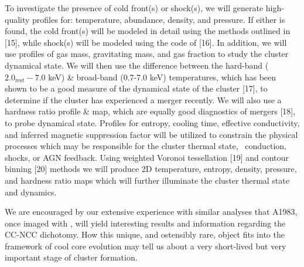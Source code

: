 \documentclass[letterpaper,11pt,twocolumn]{article}
\begin{document}
To investigate the presence of cold front(s) or shock(s), we will
generate high-quality profiles for: temperature, abundance, density,
and pressure. If either is found, the cold front(s) will be modeled in
detail using the methods outlined in [15], while shock(s) will be
modeled using the code of [16]. In addition, we will use profiles of
gas mass, gravitating mass, and gas fraction to study the cluster
dynamical state. We will then use the difference between the hard-band
($2.0_{\mathrm{rest}}-7.0$ keV) \& broad-band (0.7-7.0 keV)
temperatures, which has been shown to be a good measure of the
dynamical state of the cluster [17], to determine if the cluster has
experienced a merger recently. We will also use a hardness ratio
profile \& map, which are equally good diagnostics of mergers [18], to
probe dynamical state. Profiles for entropy, cooling time, effective
conductivity, and inferred magnetic suppression factor will be
utilized to constrain the physical processes which may be responsible
for the cluster thermal state, \eg\ conduction, shocks, or AGN
feedback. Using weighted Voronoi tessellation [19] and contour binning
[20] methods we will produce 2D temperature, entropy, density,
pressure, and hardness ratio maps which will further illuminate the
cluster thermal state and dynamics.

We are encouraged by our extensive experience with similar analyses
that A1983, once imaged with \chandra, will yield interesting results
and information regarding the CC-NCC dichotomy. How this unique, and
ostensibly rare, object fits into the framework of cool core evolution
may tell us about a very short-lived but very important stage of
cluster formation.\\
\end{document}
